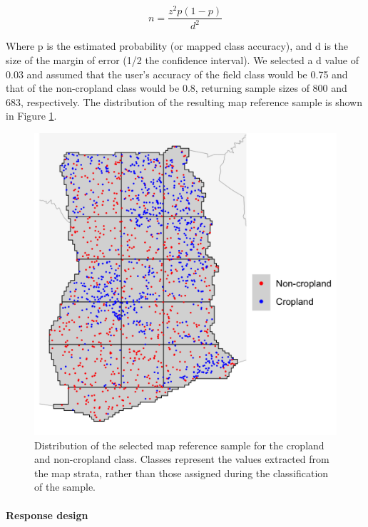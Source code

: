 \documentclass[
  11pt,
  a4paper]{article}
\begin{document}
\[n = \frac{z^2p(1-p)}{d^2}\]

Where p is the estimated probability (or mapped class accuracy), and d
is the size of the margin of error (1/2 the confidence interval). We
selected a d value of 0.03 and assumed that the user's accuracy of the
field class would be 0.75 and that of the non-cropland class would be
0.8, returning sample sizes of 800 and 683, respectively. The
distribution of the resulting map reference sample is shown in Figure
\ref{fig:refsample}.

\begin{figure}[!ht]

{\centering \includegraphics[width=0.8\linewidth,]{figures/si_map_reference_sample} 

}

\caption{Distribution of the selected map reference sample for the cropland and non-cropland class. Classes represent the values extracted from the map strata, rather than those assigned during the classification of the sample.}\label{fig:refsample}
\end{figure}

\hypertarget{response-design}{%
\paragraph{Response design}\label{response-design}}
\end{document}

